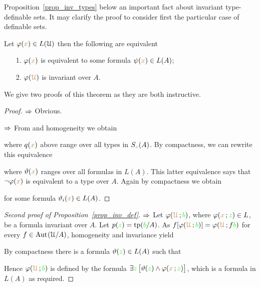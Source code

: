 \documentclass[creche.tex]{subfiles}
\begin{document}
Proposition~\ref{prop_inv_types} below an important fact about invariant type-definable sets. It may clarify the proof to consider first the particular case of definable sets.

\begin{proposition}\label{prop_inv_def}
Let $\varphi({\color{brown} x})\in L(\EuScript U)$ then the following are equivalent
\begin{itemize}
 \item[1.] $\varphi({\color{brown} x})$ is equivalent to some formula $\psi({\color{brown} x})\in L(A)$;
 \item[2.] $\varphi({\color{brown}\EuScript U})$ is invariant over $A$.
\end{itemize}
\end{proposition}

We give two proofs of this theorem as they are both instructive. 

\begin{proof}
$\Rightarrow$ Obvious.

$\Rightarrow$ From  and homogeneity we obtain


where $q({\color{brown} x})$ above range over all types in $S_{\color{brown} x}(A)$. By compactness, we can rewrite this equivalence 


where $\vartheta({\color{brown} x})$ ranges over all formulas in $L(A)$.  This latter equivalence says that $\neg\varphi({\color{brown} x})$ is equivalent to a type over $A$. Again by compactness we obtain 


for some formula $\vartheta_i({\color{brown} x})\in L(A)$.
\end{proof}


\begin{proof}[Second proof of Proposition~\ref{prop_inv_def}] $\Rightarrow$ Let $\varphi({\color{brown}\EuScript U}\,;{\color{green} b})$, where $\varphi({\color{brown} x}\,;{\color{green} z})\in L$, be a formula invariant over $A$. Let $p({\color{green} z})={\rm tp}({\color{green} b}/A)$. As $f[\varphi({\color{brown}\EuScript U}\,;{\color{green} b})]=\varphi({\color{brown}\EuScript U}\,;f{\color{green} b})$  for every $f\in\textrm{Aut\kern.15ex}(\EuScript U/A)$, homogeneity and invariance yield


By compactness there is a formula $\vartheta({\color{green} z})\in L(A)$ such that 


Hence  $\varphi({\color{brown}\EuScript U}\,;{\color{green} b})$ is defined by the formula $\exists {\color{green}z}\,\big[\vartheta({\color{green} z})\wedge\varphi({\color{brown} x}\,;{\color{green} z})\big]$, which is a formula in $L(A)$ as required.
\end{proof}
\end{document}
